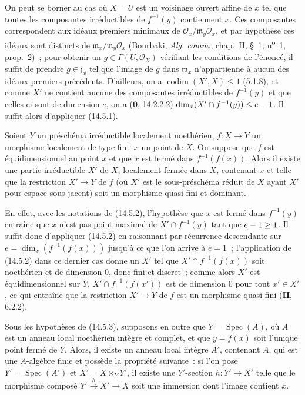 
On peut se borner au cas où $X=U$ est un voisinage ouvert affine de $x$ tel que
toutes les composantes irréductibles de $f^{-1}(y)$ contiennent $x$. Ces
composantes correspondent aux idéaux premiers minimaux de
$\mathcal O_x/\mathfrak m_y\mathcal O_x$, et par hypothèse ces idéaux sont
distincts de $\mathfrak m_x/\mathfrak m_y\mathcal O_x$ (Bourbaki,
\emph{Alg. comm.}, chap.~II, \S~1, n\textsuperscript{o}~1, prop.~2)~; pour obtenir
un $g\in\Gamma(U,\mathcal O_X)$ vérifiant les conditions de l'énoncé, il suffit de
prendre $g\in\mathfrak j_x$ tel que l'image de $g$ dans $\mathfrak m_x$
n'appartienne à aucun des idéaux premiers précédents. D'ailleurs, on a
$\operatorname{codim}(X',X)\leq 1$ (5.1.8), et comme $X'$ ne contient aucune des composantes
irréductibles de $f^{-1}(y)$ et que celles-ci sont de dimension $e$, on a
($\mathbf 0$, 14.2.2.2) $\dim_x(X'\cap f^{-1}(y))\leq e- 1$. Il suffit alors
d'appliquer (14.5.1).

\begin{proposition}[14.5.3]
\label{IV.14.5.3-fr}
Soient $Y$ un préschéma irréductible localement noethérien, $f:X\to Y$ un
morphisme localement de type fini, $x$ un point de $X$. On suppose que $f$ est
équidimensionnel au point $x$ et que $x$ est fermé dans $f^{-1}(f(x))$. Alors il
existe une partie irréductible $X'$ de $X$, localement fermée dans $X$, contenant
$x$ et telle que la restriction $X'\to Y$ de $f$ \textup{(où $X'$ est le sous-préschéma
réduit de $X$ ayant $X'$ pour espace sous-jacent)} soit un morphisme quasi-fini et
dominant.
\end{proposition}

En effet, avec les notations de (14.5.2), l'hypothèse que $x$ est fermé dans
$f^{-1}(y)$ entraîne que $x$ n'est pas point maximal de $X'\cap f^{-1}(y)$ tant
que $e- 1\geq 1$. Il suffit donc d'appliquer (14.5.2) en raisonnant par récurrence
descendante sur $e=\dim_x(f^{-1}(f(x)))$ jusqu'à ce que l'on arrive à $e=1$~;
l'application de (14.5.2) dans ce dernier cas donne un $X'$ tel que
$X'\cap f^{-1}(f(x))$ soit noethérien et de dimension 0, donc fini et discret~;
comme alors $X'$ est équidimensionnel sur $Y$, $X'\cap f^{-1}(f(x'))$ est de
dimension 0 pour tout $x'\in X'$, ce qui entraîne que la restriction $X'\to Y$ de
$f$ est un morphisme quasi-fini (\textbf{II}, 6.2.2).

\begin{corollary}[14.5.4]
\label{IV.14.5.4-fr}
Sous les hypothèses de \textup{(14.5.3)}, supposons en outre que $Y=\operatorname{Spec}(A)$, où $A$ est
un anneau local noethérien intègre et \textup{complet}, et que $y=f(x)$ soit l'unique point
fermé de $Y$. Alors, il existe un anneau local intègre $A'$, contenant $A$, qui est
une $A$-algèbre finie et possède la propriété suivante~: si l'on pose
$Y'=\operatorname{Spec}(A')$ et $X'=X\times_Y Y'$, il existe une $Y'$-section $h:Y'\to X'$ telle
que le morphisme composé $Y'\xrightarrow{h}X'\to X$ soit une immersion dont
l'image contient $x$.
\end{corollary}

